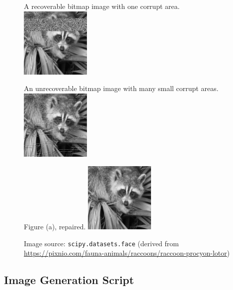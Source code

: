 \begin{figure}[H]
    \centering
    \begin{subcaptionbox}{A recoverable bitmap image with one corrupt area.}
        {\includegraphics[width=0.3\textwidth]{face_2.png}}
    \end{subcaptionbox}
    \hfill
    \begin{subcaptionbox}{An unrecoverable bitmap image with many small corrupt areas.}
        {\includegraphics[width=0.3\textwidth]{face_3.png}}
    \end{subcaptionbox}
    \hfill
    \begin{subcaptionbox}{Figure (a), repaired.}
        {\includegraphics[width=0.3\textwidth]{face_2_repaired.png}}
    \end{subcaptionbox}
    
    \caption{Image source: \texttt{scipy.datasets.face} (derived from \url{https://pixnio.com/fauna-animals/raccoons/raccoon-procyon-lotor})}
\end{figure}

\clearpage

\subsection{Image Generation Script}

